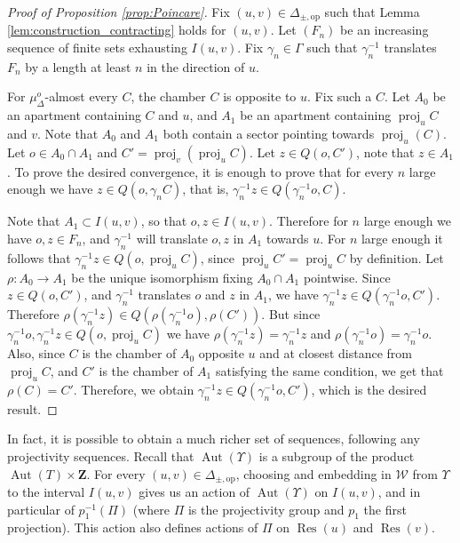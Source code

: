 \documentclass[a4paper, 11pt]{article}
\theoremstyle{plain}
\theoremstyle{definition}
\theoremstyle{remark}
\DeclareMathOperator{\Aut}{Aut}
\DeclareMathOperator{\proj}{proj}
\DeclareMathOperator{\Res}{Res}
\newcommand{\ZZ}{\mathbf{Z}}                          %
\newcommand{\scrW}{\mathscr W}
\newcommand{\pmop}{ {\pm,\mathrm{op}}}
\begin{document}
\begin{proof}[Proof of Proposition \ref{prop:Poincare}]
Fix $(u,v)\in \Delta_\pmop$ such that Lemma \ref{lem:construction_contracting} holds for $(u,v)$. Let $(F_n)$ be an increasing sequence of finite sets exhausting $I(u,v)$. Fix $\gamma_n\in \Gamma$ such that $\gamma_n^{-1}$ translates $F_n$ by a length at least $n$ in the direction of $u$.

For $\mu^o_\Delta$-almost every $C$, the chamber $C$ is opposite to $u$. Fix such a $C$. Let $A_0$ be an apartment containing $C$ and $u$, and $A_1$ be an apartment containing $\proj_u C$ and $v$. Note that $A_0$ and $A_1$ both contain a sector pointing towards $\proj_u (C)$. Let $o\in A_0\cap A_1$ and $C'=\proj_v(\proj_u C)$. Let $z\in Q(o,C')$, note that $z\in A_1$. To prove the desired convergence, it is enough to prove that for every $n$ large enough we have $z\in Q(o,\gamma_n C)$, that is, $\gamma_n^{-1} z\in Q(\gamma_n^{-1} o,C)$.

Note that $A_1\subset I(u,v)$, so that $o,z\in I(u,v)$. Therefore for $n$ large enough we have $o,z\in F_n$, and $\gamma_n^{-1}$ will translate $o,z$ in $A_1$ towards $u$. For $n$ large enough it follows that $\gamma_n^{-1} z\in Q(o,\proj_u C)$, since $\proj_u C'=\proj_u C$ by definition. Let $\rho:A_0\to A_1$ be the unique isomorphism fixing $A_0\cap A_1$ pointwise. Since $z\in Q(o,C')$, and  $\gamma_n^{-1}$ translates $o$ and $z$ in $A_1$, we have $\gamma_n^{-1} z \in Q(\gamma^{-1}_n o, C')$. Therefore $\rho(\gamma_n^{-1} z)\in Q(\rho(\gamma_n^{-1}o),\rho(C'))$. But since $\gamma_n^{-1}o,\gamma_n^{-1}z\in Q(o,\proj_u C)$ we have $\rho(\gamma_n^{-1} z)=\gamma_n^{-1} z$ and $\rho(\gamma_n^{-1} o)=\gamma_n^{-1} o$. Also, since $C$ is the chamber of $A_0$ opposite $u$ and at closest distance from $\proj_u C$, and $C'$ is the chamber of $A_1$ satisfying the same condition, we get that $\rho(C)=C'$. Therefore, we obtain $\gamma_n^{-1} z\in Q(\gamma_n^{-1}o,C')$, which is the desired result.
\end{proof}

In fact, it is possible to obtain a much richer set of sequences, following any projectivity sequences.  Recall that $\Aut(\Upsilon)$ is a subgroup of the product $\Aut(T)\times \ZZ$. For every $(u,v)\in \Delta_\pmop$, choosing and embedding  in $\scrW$ from $\Upsilon$ to the interval $I(u,v)$ gives us  an action of $\Aut(\Upsilon)$ on $I(u,v)$, and in particular of $p_1^{-1}(\Pi)$ (where $\Pi$ is the projectivity group and $p_1$ the first projection). This action also defines actions of $\Pi$ on $\Res(u)$ and $\Res(v)$. 
\end{document}
